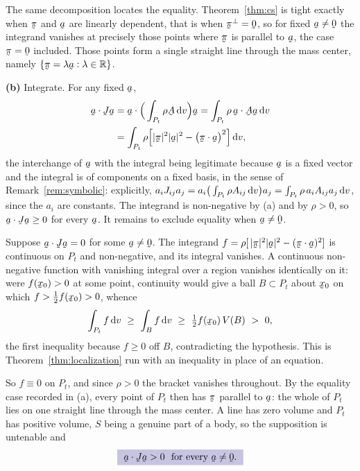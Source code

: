 \begin{solution}
The same decomposition locates the equality. Theorem~\ref{thm:cs} is
tight exactly when $\vek\pi$ and $\ba$ are linearly dependent, that is
when $\vek\pi^{\perp}=\bze$, so for fixed $\ba\neq\bze$ the integrand
vanishes at precisely those points where $\vek\pi$ is parallel to
$\ba$, the case $\vek\pi=\bze$ included. Those points form a single
straight line through the mass center, namely
$\{\vek\pi=\lambda\ba:\lambda\in\Rn\}$.

\medskip
\noindent\textbf{(b)}
Integrate. For any fixed $\ba$,
\[
\begin{aligned}
   \ip\ba{\vek{J}\ba}
   &=\ip\ba{\Big(\int_{P_{t}}\rho\bA\,\dl v\Big)\ba}
    =\int_{P_{t}}\rho\,\ip\ba{\bA\ba}\,\dl v\\
   &=\int_{P_{t}}\rho\Big[|\vek\pi|^{2}|\ba|^{2}
     -\big(\ip{\vek\pi}\ba\big)^{2}\Big]\,\dl v ,
\end{aligned}
\]
the interchange of $\ba$ with the integral being legitimate because
$\ba$ is a fixed vector and the integral is of components on a fixed
basis, in the sense of Remark~\ref{rem:symbolic}: explicitly,
$a_{i}J_{ij}a_{j}=a_{i}\big(\int_{P_{t}}\rho A_{ij}\,\mathrm{d} v\big)a_{j}
=\int_{P_{t}}\rho\,a_{i}A_{ij}a_{j}\,\mathrm{d} v$, since the $a_{i}$ are
constants. The integrand is non-negative by (a) and by $\rho>0$, so
$\ip\ba{\vek{J}\ba}\geq0$ for every $\ba$. It remains to exclude
equality when $\ba\neq\bze$.

Suppose $\ip\ba{\vek{J}\ba}=0$ for some $\ba\neq\bze$. The integrand
$f=\rho[\,|\vek\pi|^{2}|\ba|^{2}-(\ip{\vek\pi}\ba)^{2}]$ is continuous
on $P_{t}$ and non-negative, and its integral vanishes. A continuous
non-negative function with vanishing integral over a region vanishes
identically on it: were $f(\bx_{0})>0$ at some point, continuity would
give a ball $B\subset P_{t}$ about $\bx_{0}$ on which
$f>\tfrac12f(\bx_{0})>0$, whence
\[
   \int_{P_{t}}f\,\dl v\ \geq\ \int_{B}f\,\dl v
   \ \geq\ \tfrac12f(\bx_{0})\,V(B)\ >\ 0 ,
\]
the first inequality because $f\geq0$ off $B$, contradicting the
hypothesis. This is Theorem~\ref{thm:localization} run with an
inequality in place of an equation.

So $f\equiv0$ on $P_{t}$, and since $\rho>0$ the bracket vanishes
throughout. By the equality case recorded in (a), every point of
$P_{t}$ then has $\vek\pi$ parallel to $\ba$: the whole of $P_{t}$ lies
on one straight line through the mass center. A line has zero volume
and $P_{t}$ has positive volume, $S$ being a genuine part of a body, so
the supposition is untenable and
\[
   \boxed{\ \ip\ba{\vek{J}\ba}>0\ \text{ for every }\ba\neq\bze .\ }
\]


\end{solution}
